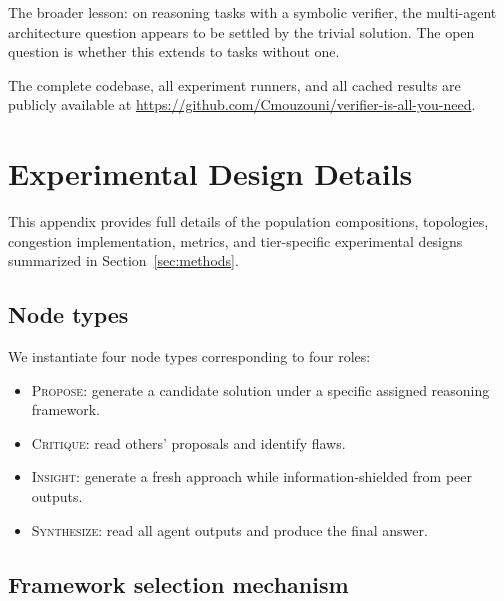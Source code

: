 \documentclass[11pt]{amsart}
\newcommand\1{{\mathds{1}}}
\theoremstyle{definition}
\theoremstyle{remark}
\numberwithin{equation}{section}
\begin{document}
The broader lesson: on reasoning tasks with a symbolic verifier, the multi-agent architecture question appears to be settled by the trivial solution.
The open question is whether this extends to tasks without one.

The complete codebase, all experiment runners, and all cached results are publicly available at \url{https://github.com/Cmouzouni/verifier-is-all-you-need}.

\appendix

\section{Experimental Design Details}\label{app:methods}

This appendix provides full details of the population compositions, topologies, congestion implementation, metrics, and tier-specific experimental designs summarized in Section~\ref{sec:methods}.

\subsection{Node types}

We instantiate four node types corresponding to four roles:
\begin{itemize}[leftmargin=1.2em, itemsep=2pt]
\item \textsc{Propose}: generate a candidate solution under a specific assigned reasoning framework.
\item \textsc{Critique}: read others' proposals and identify flaws.
\item \textsc{Insight}: generate a fresh approach while information-shielded from peer outputs.
\item \textsc{Synthesize}: read all agent outputs and produce the final answer.
\end{itemize}

\subsection{Framework selection mechanism}
\end{document}
